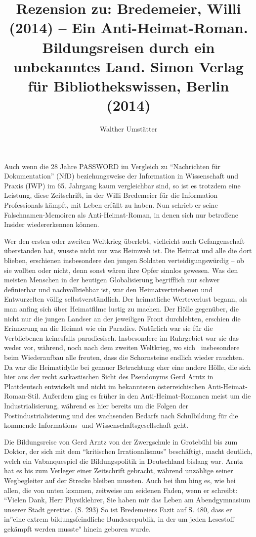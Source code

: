 \documentclass[a4paper,
fontsize=11pt,
oneside,
numbers=noperiodatend,
parskip=half-,
bibliography=totoc,
final
]{scrartcl}
\title{\LARGE{Rezension zu: Bredemeier, Willi (2014) – Ein Anti-Heimat-Roman. Bildungsreisen durch ein unbekanntes Land. Simon Verlag für Bibliothekswissen, Berlin (2014)}} %
\author{Walther Umstätter} %
\date{}
\begin{document}
\maketitle
\thispagestyle{fancyplain} 


Auch wenn die 28 Jahre PASSWORD im Vergleich zu \enquote{Nachrichten für
Dokumentation} (NfD) beziehungsweise der Information in Wissenschaft und
Praxis (IWP) im 65. Jahrgang kaum vergleichbar sind, so ist es trotzdem
eine Leistung, diese Zeitschrift, in der Willi Bredemeier für die
Information Professionals kämpft, mit Leben erfüllt zu haben. Nun
schrieb er seine Falschnamen-Memoiren als Anti-Heimat-Roman, in denen
sich nur betroffene Insider wiedererkennen können.

Wer den ersten oder zweiten Weltkrieg überlebt, vielleicht auch
Gefangenschaft überstanden hat, wusste nicht nur was Heimweh ist. Die
Heimat und alle die dort blieben, erschienen insbesondere den jungen
Soldaten verteidigungswürdig -- ob sie wollten oder nicht, denn sonst
wären ihre Opfer sinnlos gewesen. Was den meisten Menschen in der
heutigen Globalisierung begrifflich nur schwer definierbar und
nachvollziehbar ist, war den Heimatvertriebenen und Entwurzelten völlig
selbstverständlich. Der heimatliche Werteverlust begann, als man anfing
sich über Heimatfilme lustig zu machen. Der Hölle gegenüber, die nicht
nur die jungen Landser an der jeweiligen Front durchlebten, erschien die
Erinnerung an die Heimat wie ein Paradies. Natürlich war sie für die
Verbliebenen keinesfalls paradiesisch. Insbesondere im Ruhrgebiet war
sie das weder vor, während, noch nach dem zweiten Weltkrieg, wo sich~
insbesondere beim Wiederaufbau alle freuten, dass die Schornsteine
endlich wieder rauchten. Da war die Heimatidylle bei genauer Betrachtung
eher eine andere Hölle, die sich hier aus der recht sarkastischen Sicht
des Pseudonyms Gerd Arntz in Plattdeutsch entwickelt und nicht im
bekannteren österreichischen Anti-Heimat-Roman-Stil. Außerdem ging es
früher in den Anti-Heimat-Romanen meist um die Industrialisierung,
während es hier bereits um die Folgen der Postindustrialisierung und des
wachsenden Bedarfs nach Schulbildung für die kommende Informations- und
Wissenschaftsgesellschaft geht.~

Die Bildungsreise von Gerd Arntz von der Zwergschule in Grotebühl bis
zum Doktor, der sich mit dem \enquote{kritischen Irrationalismus}
beschäftigt, macht deutlich, welch ein Vabanquespiel die Bildungspolitik
in Deutschland bislang war. Arntz hat es bis zum Verleger einer
Zeitschrift gebracht, während unzählige seiner Wegbegleiter auf der
Strecke bleiben mussten. Auch bei ihm hing es, wie bei allen, die von
unten kommen, zeitweise am seidenen Faden, wenn er schreibt:
\enquote{Vielen Dank, Herr Physiklehrer, Sie haben mir das Leben am
Abendgymnasium unserer Stadt gerettet. (S. 293) So ist Bredemeiers Fazit
auf S. 480, dass er in}eine extrem bildungsfeindliche Bundesrepublik, in
der um jeden Lesestoff gekämpft werden musste" hinein geboren wurde.~
\end{document}
